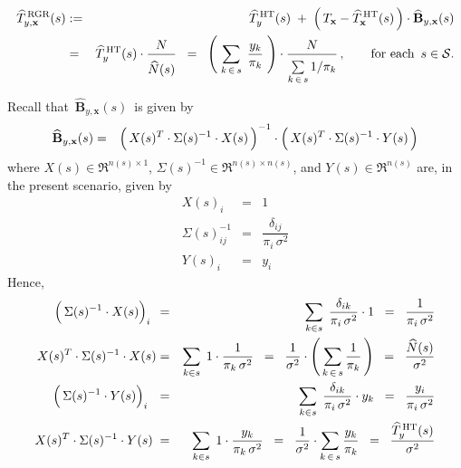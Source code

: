 \begin{proposition}
\begin{eqnarray*}
\widehat{T}^{\,\textnormal{RGR}}_{y,\mathbf{x}}(s)
& := &
	\widehat{T}^{\,\textnormal{HT}}_{y}(s)
	\; + \;
	\left(\,T_{\mathbf{x}} - \widehat{T}^{\,\textnormal{HT}}_{\mathbf{x}}(s) \,\right)
	\cdot
	\widehat{\mathbf{B}}_{y,\mathbf{x}}(s)
\\
& = &
	\widehat{T}^{\,\textnormal{HT}}_{y}(s)
	\cdot
	\dfrac{
		N
	}{
		\overset{{\color{white}.}}{\widehat{N}(s)}
	}
\;\; = \;\;
	\left(\; \underset{k\,\in\,s}{\sum}\;\, \dfrac{ y_{k} }{ \pi_{k} } \;\right)
	\cdot
	\dfrac{
		N
		}{
		\underset{k\,\in\,s}{\overset{{\color{white}.}}{\sum}}\, 1/\pi_{k}
		}
	\,,\quad\quad\textnormal{for each \,$s \in \mathcal{S}$}.
\end{eqnarray*}
\end{proposition}
\proof
Recall that \,$\widehat{\mathbf{B}}_{y,\mathbf{x}}(s)$\, is given by
\begin{eqnarray*}
\widehat{\mathbf{B}}_{y,\mathbf{x}}(s)
& = &
	\left(\,X(s)^{T} \overset{{\color{white}!}}{\cdot} \Sigma(s)^{-1} \cdot X(s)\,\right)^{-1}
	\cdot
	\left(\,X(s)^{T} \overset{{\color{white}!}}{\cdot} \Sigma(s)^{-1} \cdot Y(s) \,\right)
\end{eqnarray*}
where $X(s) \in \Re^{n(s) \times 1}$, $\Sigma(s)^{-1} \in \Re^{n(s) \times n(s)}$, and $Y(s) \in \Re^{n(s)}$
are, in the present scenario, given by
\begin{eqnarray*}
X(s)_{i}
& = &
	1
\\
\Sigma(s)^{-1}_{ij}
& = &
	\dfrac{\delta_{ij}}{\pi_{i}\,\sigma^{2}}
\\
Y(s)_{i}
& = &
	y_{i}
\end{eqnarray*}
Hence,
\begin{eqnarray*}
\left(\,\Sigma(s)^{-1} \overset{{\color{white}!}}{\cdot} X(s)\right)_{i}{\color{white}!}
& = &
	\underset{k \in s}{\sum}\;\,
	\dfrac{\delta_{ik}}{\pi_{i}\,\sigma^{2}} \cdot 1
\;\; = \;\;
	\dfrac{1}{\pi_{i}\,\sigma^{2}}
\\
X(s)^{T}\cdot\Sigma(s)^{-1} \overset{{\color{white}!}}{\cdot} X(s)
& = &
	\underset{k \in s}{\sum}\;\,
	1 \cdot \dfrac{1}{\pi_{k}\,\sigma^{2}}
\;\; = \;\;
	\dfrac{1}{\sigma^{2}}
	\cdot
	\left(\,\underset{k\,\in\,s}{\sum}\,\dfrac{1}{\pi_{k}}\,\right)
\;\; = \;\;
	\dfrac{\widehat{N}(s)}{\sigma^{2}}
\\
\left(\,\Sigma(s)^{-1} \overset{{\color{white}!}}{\cdot} Y(s)\right)_{i}{\color{white}1}
& = &
	\underset{k \in s}{\sum}\;\,
	\dfrac{\delta_{ik}}{\pi_{i}\,\sigma^{2}}
	\cdot
	y_{k}
\;\; = \;\;
	\dfrac{y_{i}}{\pi_{i}\,\sigma^{2}}
\\
X(s)^{T}\cdot\Sigma(s)^{-1} \overset{{\color{white}!}}{\cdot} Y(s){\color{white}!}
& = &
	\underset{k \in s}{\sum}\;\,
	1 \cdot \dfrac{y_{k}}{\pi_{k}\,\sigma^{2}}
\;\; = \;\;
	\dfrac{1}{\sigma^{2}}
	\cdot
	\underset{k\,\in\,s}{\sum}\, \dfrac{y_{k}}{\pi_{k}}
\;\; = \;\;
	\dfrac{\widehat{T}^{\,\textnormal{HT}}_{y}(s)}{\sigma^{2}}
\end{eqnarray*}
